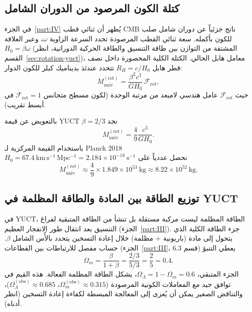 \documentclass[12pt,a4paper]{article}
\begin{document}
	\subsection{كتلة الكون المرصود من الدوران الشامل}
	
	في الجزء~\ref{part:IV} يُظهر أن ثنائي قطب CMB ناتج جزئياً عن دوران شامل صلب للكون بأكمله. سعة ثنائي القطب المرصودة تحدد السرعة الزاوية \(\omega\)، وعبر العلاقة \(H_0 = \beta \omega\) (المشتقة من التوازن بين طاقة التنسيق والطاقة الحركية الدورانية، انظر القسم~\ref{sec:rotation-yuct})، معامل هابل الحالي. الكتلة الكلية المحصورة داخل نصف قطر هابل \(R_H = c / H_0\) تتحدد عندئذ بديناميك كبلر للكون الدوار:
	\begin{equation}
		M_{\mathrm{univ}}^{\mathrm{(rot)}} = \frac{\beta^2 c^3}{G H_0} \, \mathcal{F}_{\mathrm{rot}},
		\label{eq:muniv-rot}
	\end{equation}
	حيث \(\mathcal{F}_{\mathrm{rot}}\) عامل هندسي لامبعد من مرتبة الوحدة (لكون مسطح متجانس \(\mathcal{F}_{\mathrm{rot}} = 1\) في أبسط تقريب).
	
	بالتعويض عن قيمة YUCT \(\beta = 2/3\) نجد
	\begin{equation}
		M_{\mathrm{univ}}^{\mathrm{(rot)}} = \frac{4}{9} \frac{c^3}{G H_0}.
		\label{eq:muniv-rot-beta}
	\end{equation}
	باستخدام القيمة المركزية لـ Planck 2018 \(H_0 = 67.4\ \mathrm{km\,s^{-1}\,Mpc^{-1}} = 2.184\times 10^{-18}\ \mathrm{s^{-1}}\) نحصل عددياً على
	\[
	M_{\mathrm{univ}}^{\mathrm{(rot)}} \approx \frac{4}{9} \times 1.849\times 10^{53}\ \mathrm{kg} \approx 8.22\times 10^{52}\ \mathrm{kg}.
	\]
	
	\subsection{توزيع الطاقة بين المادة والطاقة المظلمة في YUCT}
	
	في YUCT، الطاقة المظلمة ليست مركبة مستقلة بل تنشأ من الطاقة المتبقية لفراغ التنسيق بعد انتقال طور الانفجار العظيم (الجزء~\ref{part:III}). جزء الطاقة الكلية الذي يتحول إلى مادة (باريونية + مظلمة) خلال إعادة التسخين يتحدد بالأُس الشامل \(\beta\). حساب مفصل للارتباطات بين القطاعات (الجزء~\ref{part:III}، قسم 6.3) يعطي التنبؤ
	\begin{equation}
		\Omega_m = \frac{\beta}{1+\beta} = \frac{2/3}{5/3} = \frac{2}{5} = 0.4.
		\label{eq:Om-pred}
	\end{equation}
	الجزء المتبقي، \(\Omega_\Lambda = 1 - \Omega_m = 0.6\)، يشكل الطاقة المظلمة الفعالة. هذه القيم في توافق جيد مع المعاملات الكونية المرصودة (\(\Omega_m^{\mathrm{(obs)}} \approx 0.315\)، \(\Omega_\Lambda^{\mathrm{(obs)}} \approx 0.685\))، والتناقض الصغير يمكن أن يُعزى إلى المعالجة المبسطة لكفاءة إعادة التسخين (انظر أدناه).
	
\end{document}

